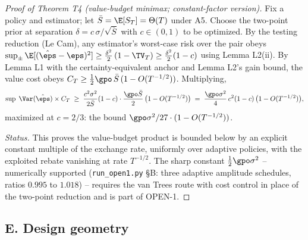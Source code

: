 \begin{proof}[Proof of Theorem T4 (value-budget minimax; constant-factor
version)]
Fix a policy and estimator; let $\bar S = \E[S_T] = \Theta(T)$ under A5.
Choose the two-point prior at separation $\delta = c\,\sigma/\sqrt{\bar S}$
with $c \in (0,1)$ to be optimized. By the testing reduction (Le Cam), any
estimator's worst-case risk over the pair obeys
$\sup_{\pm} \E[(\hat\eps - \eps)^2] \ge \tfrac{\delta^2}{2}\,(1 - \TV_T)
\ge \tfrac{\delta^2}{2}(1 - c)$ using Lemma L2(ii). By Lemma L1 with the
certainty-equivalent anchor and Lemma L2's gain bound, the value cost obeys
$C_T \ge \tfrac{1}{2}\gpo\,\bar S\,(1 - O(T^{-1/2}))$. Multiplying,
\[
\sup\; \Var(\hat\eps)\times C_T
 \;\ge\; \frac{c^2\sigma^2}{2\bar S}(1-c)\cdot
 \frac{\gpo \bar S}{2}\,\big(1 - O(T^{-1/2})\big)
 \;=\; \frac{\gpo\sigma^2}{4}\,c^2(1-c)\,\big(1 - O(T^{-1/2})\big),
\]
maximized at $c = 2/3$: the bound $\gpo\sigma^2/27 \cdot (1 - O(T^{-1/2}))$.

\emph{Status.} This proves the value-budget product is bounded below by an
explicit constant multiple of the exchange rate, uniformly over adaptive
policies, with the exploited rebate vanishing at rate $T^{-1/2}$. The
sharp constant $\tfrac{1}{2}\gpo\sigma^2$ -- numerically supported
(\texttt{run\_open1.py} \S B: three adaptive amplitude schedules, ratios
$0.995$ to $1.018$) -- requires the van Trees route with
cost control in place of the two-point reduction and is part of OPEN-1.
\end{proof}

\subsection*{E. Design geometry}

